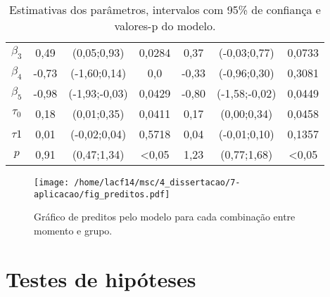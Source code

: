 \begin{table}[H]
\begin{tabular}{c|cccccc}
$\beta_3$                  & 0,49       & (0,05;0,93)                                                       & \multicolumn{1}{c|}{0,0284} & 0,37       & (-0,03;0,77)                                                      & 0,0733           \\
$\beta_4$                  & -0,73      & (-1,60;0,14)                                                      & \multicolumn{1}{c|}{0,0}            & -0,33      & (-0,96;0,30)                                                      & 0,3081           \\
$\beta_5$                  & -0,98      & (-1,93;-0,03)                                                     & \multicolumn{1}{c|}{0,0429} & -0,80      & (-1,58;-0,02)                                                     & 0,0449 \\
$\tau_0$                   & 0,18       & (0,01;0,35)                                                       & \multicolumn{1}{c|}{0,0411} & 0,17       & (0,00;0,34)                                                       & 0,0458           \\
$\tau1$                    & 0,01       & (-0,02;0,04)                                                      & \multicolumn{1}{c|}{0,5718}           & 0,04       & (-0,01;0,10)                                                      & 0,1357           \\
$p$                        & 0,91       & (0,47;1,34)                                                       & \multicolumn{1}{c|}{\textless 0,05} & 1,23       & (0,77;1,68)                                                       & \textless 0,05 \\ \hline
\end{tabular}
\caption{Estimativas dos parâmetros, intervalos com 95\% de confiança e valores-p do modelo.}
\label{tab:estimativas}
\end{table}

\begin{figure}[H]
\centering
\texttt{[image: /home/lacf14/msc/4\_dissertacao/7-aplicacao/fig\_preditos.pdf]}
\caption{Gráfico de preditos pelo modelo para cada combinação entre momento e grupo.}
\label{fig:preds}
\end{figure}


\section{Testes de hipóteses}


